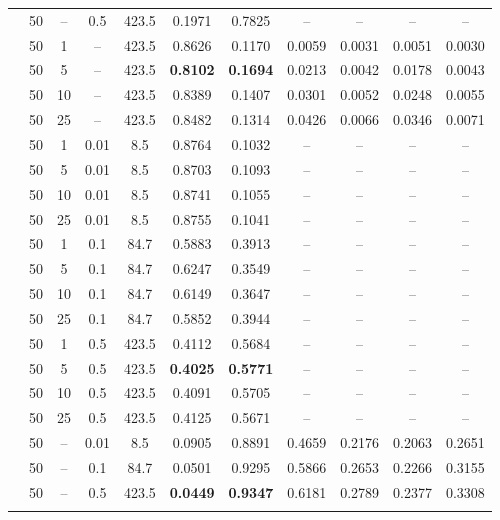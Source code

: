 \documentclass[11pt,twocolumn,a4paper,DIV=calc,parskip=half]{scrartcl}
\begin{document}
\begin{longtable}{@{}l c c c c c c c c c c@{}}
		& 50 & -- & 0.5 & 423.5 & 0.1971 & 0.7825 & -- & -- & -- & -- \\
		\arrayrulecolor{gray!60}\midrule\arrayrulecolor{black}
		\multirow{4}{*}{\textbf{DP + FLTrust}} & 50 & 1 & -- & 423.5 & 0.8626 & 0.1170 & 0.0059 & 0.0031 & 0.0051 & 0.0030 \\
		& 50 & 5 & -- & 423.5 & \textbf{0.8102} & \textbf{0.1694} & 0.0213 & 0.0042 & 0.0178 & 0.0043 \\
		& 50 & 10 & -- & 423.5 & 0.8389 & 0.1407 & 0.0301 & 0.0052 & 0.0248 & 0.0055 \\
		& 50 & 25 & -- & 423.5 & 0.8482 & 0.1314 & 0.0426 & 0.0066 & 0.0346 & 0.0071 \\
		\arrayrulecolor{gray!60}\midrule\arrayrulecolor{black}
		\multirow{12}{*}{\textbf{DP + TopK}} & 50 & 1 & 0.01 & 8.5 & 0.8764 & 0.1032 & -- & -- & -- & -- \\
		& 50 & 5 & 0.01 & 8.5 & 0.8703 & 0.1093 & -- & -- & -- & -- \\
		& 50 & 10 & 0.01 & 8.5 & 0.8741 & 0.1055 & -- & -- & -- & -- \\
		& 50 & 25 & 0.01 & 8.5 & 0.8755 & 0.1041 & -- & -- & -- & -- \\
		& 50 & 1 & 0.1 & 84.7 & 0.5883 & 0.3913 & -- & -- & -- & -- \\
		& 50 & 5 & 0.1 & 84.7 & 0.6247 & 0.3549 & -- & -- & -- & -- \\
		& 50 & 10 & 0.1 & 84.7 & 0.6149 & 0.3647 & -- & -- & -- & -- \\
		& 50 & 25 & 0.1 & 84.7 & 0.5852 & 0.3944 & -- & -- & -- & -- \\
		& 50 & 1 & 0.5 & 423.5 & 0.4112 & 0.5684 & -- & -- & -- & -- \\
		& 50 & 5 & 0.5 & 423.5 & \textbf{0.4025} & \textbf{0.5771} & -- & -- & -- & -- \\
		& 50 & 10 & 0.5 & 423.5 & 0.4091 & 0.5705 & -- & -- & -- & -- \\
		& 50 & 25 & 0.5 & 423.5 & 0.4125 & 0.5671 & -- & -- & -- & -- \\
		\arrayrulecolor{gray!60}\midrule\arrayrulecolor{black}
		\multirow{3}{*}{\textbf{FLTrust + TopK}} & 50 & -- & 0.01 & 8.5 & 0.0905 & 0.8891 & 0.4659 & 0.2176 & 0.2063 & 0.2651 \\
		& 50 & -- & 0.1 & 84.7 & 0.0501 & 0.9295 & 0.5866 & 0.2653 & 0.2266 & 0.3155 \\
		& 50 & -- & 0.5 & 423.5 & \textbf{0.0449} & \textbf{0.9347} & 0.6181 & 0.2789 & 0.2377 & 0.3308 \\
		\arrayrulecolor{gray!60}\midrule\arrayrulecolor{black}

\end{longtable}
\end{document}
